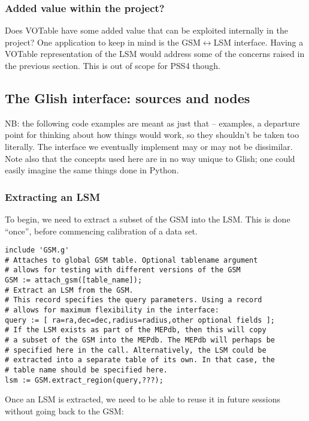 \documentclass[]{lofar}
\begin{document}
\subsubsection{Added value within the project?}
  
  Does VOTable have some added value that can be exploited internally in the
  project? One application to keep in mind is the GSM$\leftrightarrow$LSM
  interface. Having a VOTable representation of the LSM would address some of the
  concerns raised in the previous section. This is out of scope for PSS4 though.
  
\subsection{The Glish interface: sources and nodes}
  
  NB: the following code examples are meant as just that -- examples, a departure
  point for thinking about how things would work, so they shouldn't be taken too
  literally. The interface we eventually implement may or may not be dissimilar.
  Note also that the concepts used here are in no way unique to Glish; one could
  easily imagine the same things done in Python. 
  
\subsubsection{Extracting an LSM}
  
  To begin, we need to extract a subset of the GSM into the LSM. This is done
  ``once'', before commencing calibration of a data set.
  
\begin{verbatim}
include 'GSM.g'
# Attaches to global GSM table. Optional tablename argument 
# allows for testing with different versions of the GSM
GSM := attach_gsm([table_name]);   
# Extract an LSM from the GSM.
# This record specifies the query parameters. Using a record 
# allows for maximum flexibility in the interface:
query := [ ra=ra,dec=dec,radius=radius,other optional fields ];
# If the LSM exists as part of the MEPdb, then this will copy 
# a subset of the GSM into the MEPdb. The MEPdb will perhaps be 
# specified here in the call. Alternatively, the LSM could be 
# extracted into a separate table of its own. In that case, the 
# table name should be specified here.
lsm := GSM.extract_region(query,???);
\end{verbatim}
  
  Once an LSM is extracted, we need to be able to reuse it in future
  sessions without going back to the GSM:
  
\end{document}
